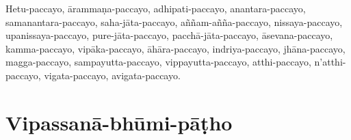 \begin{paritta}
Hetu-paccayo, ārammaṇa-paccayo, adhipati-paccayo, anantara-paccayo,
samanantara-paccayo, saha-jāta-paccayo, aññam-añña-paccayo,
nissaya-paccayo, upanissaya-paccayo, pure-jāta-paccayo,
pacchā-jāta-paccayo, āsevana-paccayo, kamma-paccayo, vipāka-paccayo,
āhāra-paccayo, indriya-paccayo, jhāna-paccayo, magga-paccayo,
sampayutta-paccayo, vippayutta-paccayo, atthi-paccayo, n'atthi-paccayo,
vigata-paccayo, avigata-paccayo.
\end{paritta}

\chapter{Vipassanā-bhūmi-pāṭho}%


